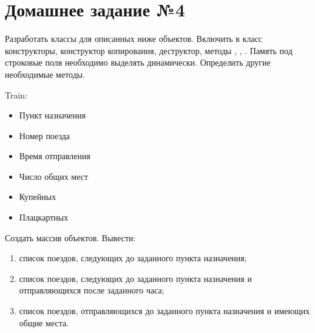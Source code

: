 \section*{Домашнее задание №4}

Разработать классы для описанных ниже объектов. Включить в класс
конструкторы, конструктор копирования, деструктор, методы ,
, . Память под строковые поля необходимо выделять
динамически. Определить другие необходимые методы.

Train:
\begin{itemize}
	\item Пункт назначения
	\item Номер поезда
	\item Время отправления
	\item Число общих мест
	\item Купейных
	\item Плацкартных
\end{itemize}

Создать массив объектов. Вывести:
\begin{enumerate}
	\item список поездов, следующих до заданного пункта назначения;
	\item список поездов, следующих до заданного пункта назначения и отправляющихся после заданного часа;
	\item список поездов, отправляющихся до заданного пункта назначения и имеющих общие места.
\end{enumerate}
